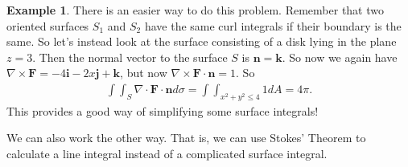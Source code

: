 \documentclass[12pt, letter]{article}
\theoremstyle{plain}
\numberwithin{theorem}{section}
\theoremstyle{definition}
\newtheorem{example}[theorem]{Example}
\begin{document}
\bigskip

\hrulefill

\bigskip

\begin{example}
There is an easier way to do this problem. Remember that two oriented surfaces $S_1$ and $S_2$ have the same curl integrals if their boundary is the same. So let's instead look at the surface consisting of a disk lying in the plane $z=3$. Then the normal vector to the surface $S$ is $\bm{n}=\bm{k}$. So now we again have $\nabla \times \bm{F} = -4\bm{i}-2x\bm{j}+\bm{k}$, but now $\nabla \times \bm{F} \cdot\bm{n} = 1$. So
\begin{align*}
\int\int_S \nabla \cdot \bm{F} \cdot\bm{n} d\sigma = \int\int_{x^2+y^2\leq 4} 1dA = 4\pi.
\end{align*}
This provides a good way of simplifying some surface integrals!
\end{example}

\bigskip

\hrulefill

\bigskip

We can also work the other way. That is, we can use Stokes' Theorem to calculate a line integral instead of a complicated surface integral.

\bigskip
\end{document}
